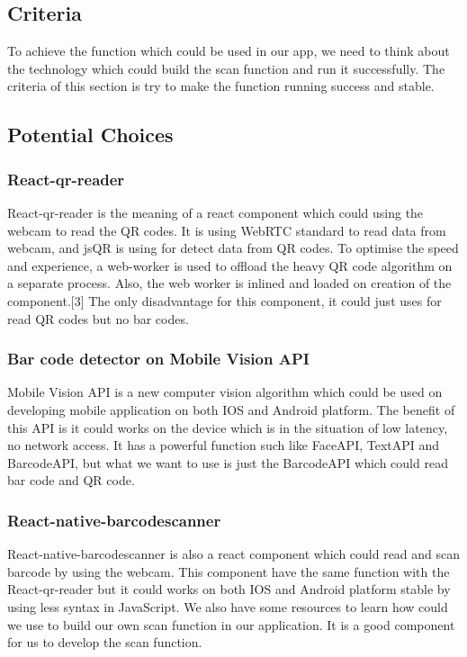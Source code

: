 \documentclass[letterpaper, 10pt,titlepage]{article}
\begin{document}
\subsection{Criteria}
To achieve the function which could be used in our app, we need to think about the technology which could build the scan function and run it successfully. The criteria of this section is try to make the function running success and stable.

\subsection{Potential Choices}

\subsubsection{React-qr-reader}
React-qr-reader is the meaning of a react component which could using the webcam to read the QR codes. It is using WebRTC standard to read data from webcam, and jsQR is using for detect data from QR codes. To optimise the speed and experience, a web-worker is used to offload the heavy QR code algorithm on a separate process. Also, the web worker is inlined and loaded on creation of the component.[3] The only disadvantage for this component, it could just uses for read QR codes but no bar codes. 

\subsubsection{Bar code detector on Mobile Vision API}
Mobile Vision API is a new computer vision algorithm which could be used on developing mobile application on both IOS and Android platform. The benefit of this API is it could works on the device which is in the situation of low latency, no network access. It has a powerful function such like FaceAPI, TextAPI and BarcodeAPI, but what we want to use is just the BarcodeAPI which could read bar code and QR code. 

\subsubsection{React-native-barcodescanner}
React-native-barcodescanner is also a react component which could read and scan barcode by using the webcam. This component have the same function with the React-qr-reader but it could works on both IOS and Android platform stable by using less syntax in JavaScript. We also have some resources to learn how could we use to build our own scan function in our application. It is a good component for us to develop the scan function.
\end{document}
